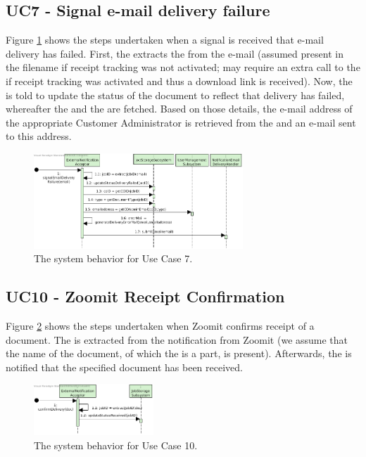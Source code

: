 \subsection{UC7 - Signal e-mail delivery failure}
Figure \ref{fig:seq_uc7} shows the steps undertaken when a signal is received that e-mail delivery has failed. First, the  extracts the  from the e-mail (assumed present in the filename if receipt tracking was not activated; may require an extra call to the  if receipt tracking was activated and thus a download link is received). Now, the  is told to update the status of the document to reflect that delivery has failed, whereafter the  and the  are fetched. Based on those details, the e-mail address of the appropriate Customer Administrator is retrieved from the  and an e-mail sent to this address.

\begin{figure}[!htp]
    \centering
    \includegraphics[width=0.7\textwidth]{figures/UC7 - Signal e-mail delivery failure.png}
    \caption{The system behavior for Use Case 7.
        }\label{fig:seq_uc7}
\end{figure}

\subsection{UC10 - Zoomit Receipt Confirmation}
Figure \ref{fig:seq_uc10} shows the steps undertaken when Zoomit confirms receipt of a document. The  is extracted from the notification from Zoomit (we assume that the name of the document, of which the  is a part, is present). Afterwards, the  is notified that the specified document has been received.

\begin{figure}[!htp]
    \centering
    \includegraphics[width=0.4\textwidth]{figures/UC10 - Zoomit Receipt Confirmation.png}
    \caption{The system behavior for Use Case 10.
        }\label{fig:seq_uc10}
\end{figure}

